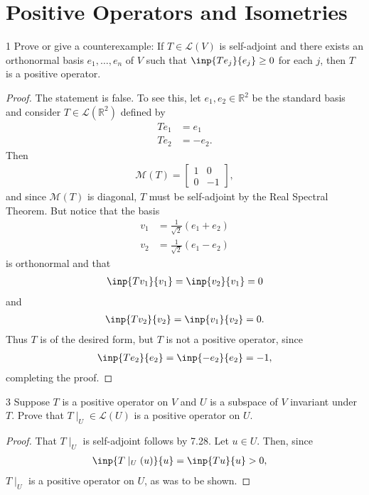 \documentclass{extarticle}
\newenvironment{problem}[1]{\begin{prob*}{#1}{}}{\end{prob*}}
\newcommand{\R}{\mathbb{R}}
\newcommand{\mat}{\mathcal{M}}
\newcommand{\Hom}{\mathcal{L}}
\begin{document}
\section{Positive Operators and Isometries}

\begin{problem}{1}
Prove or give a counterexample: If $T\in\Hom(V)$ is self-adjoint and there exists an orthonormal basis $e_1,\dots, e_n$ of $V$ such that $\inp{Te_j}{e_j}\geq 0 $ for each $j$, then $T$ is a positive operator.
\end{problem}
\begin{proof}
The statement is false.  To see this, let $e_1, e_2\in \R^2$ be the standard basis and consider $T\in\Hom(\R^2)$ defined by
\begin{align*}
Te_1 &= e_1\\
Te_2 &= -e_2.
\end{align*}
Then
\begin{align*}
\mat(T) = \begin{bmatrix}
1 & 0\\
0 & -1
\end{bmatrix},
\end{align*}
and since $\mat(T)$ is diagonal, $T$ must be self-adjoint by the Real Spectral Theorem.  But notice that the basis 
\begin{align*}
v_1 &= \frac{1}{\sqrt{2}}(e_1 + e_2)\\
v_2 &= \frac{1}{\sqrt{2}}(e_1 - e_2)
\end{align*}
is orthonormal and that
\begin{align*}
\inp{Tv_1}{v_1} = \inp{v_2}{v_1} = 0
\end{align*}
and
\begin{align*}
\inp{Tv_2}{v_2} = \inp{v_1}{v_2} = 0.
\end{align*}
Thus $T$ is of the desired form, but $T$ is not a positive operator, since 
\begin{align*}
\inp{Te_2}{e_2} = \inp{-e_2}{e_2} = -1,
\end{align*}
completing the proof.
\end{proof}

\begin{problem}{3}
Suppose $T$ is a positive operator on $V$ and $U$ is a subspace of $V$ invariant under $T$.  Prove that $T\mid_{U}\in\Hom(U)$ is a positive operator on $U$.
\end{problem}
\begin{proof}
That $T\mid_{U}$ is self-adjoint follows by 7.28.  Let $u\in U$.  Then, since
\begin{align*}
\inp{T\mid_{U}(u)}{u} &= \inp{Tu}{u} > 0,
\end{align*}
$T\mid_{U}$ is a positive operator on $U$, as was to be shown.
\end{proof}
\end{document}
